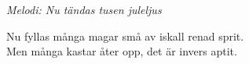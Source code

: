 {\footnotesize\textit{Melodi: Nu tändas tusen juleljus}}\par
\vspace{10pt}
Nu fyllas många magar små av iskall renad sprit.\\
Men många kastar åter opp, det är invers aptit.
